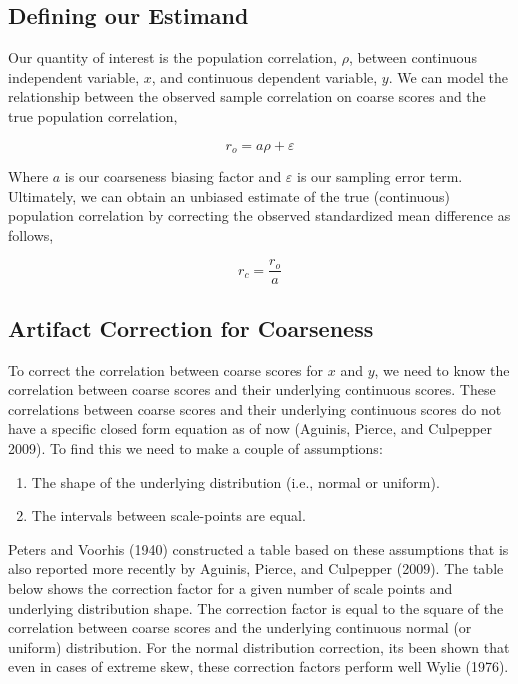 \documentclass[
  letterpaper,
  DIV=11,
  numbers=noendperiod]{scrreprt}
\providecommand{\tightlist}{%
  \setlength{\itemsep}{0pt}\setlength{\parskip}{0pt}}\usepackage{longtable,booktabs,array}
\begin{document}
\hypertarget{defining-our-estimand-5}{%
\subsection{Defining our Estimand}\label{defining-our-estimand-5}}

Our quantity of interest is the population correlation, \(\rho\),
between continuous independent variable, \(x\), and continuous dependent
variable, \(y\). We can model the relationship between the observed
sample correlation on coarse scores and the true population correlation,

\[
r_o = a\rho+\varepsilon
\]

Where \(a\) is our coarseness biasing factor and \(\varepsilon\) is our
sampling error term. Ultimately, we can obtain an unbiased estimate of
the true (continuous) population correlation by correcting the observed
standardized mean difference as follows,

\[
r_c = \frac{r_o}{a}
\]

\hypertarget{sec-coarse-cor}{%
\subsection{Artifact Correction for Coarseness}\label{sec-coarse-cor}}

To correct the correlation between coarse scores for \(x\) and \(y\), we
need to know the correlation between coarse scores and their underlying
continuous scores. These correlations between coarse scores and their
underlying continuous scores do not have a specific closed form equation
as of now (Aguinis, Pierce, and Culpepper 2009). To find this we need to
make a couple of assumptions:

\begin{enumerate}
\def\labelenumi{\arabic{enumi})}
\tightlist
\item
  The shape of the underlying distribution (i.e., normal or uniform).
\item
  The intervals between scale-points are equal.
\end{enumerate}

Peters and Voorhis (1940) constructed a table based on these assumptions
that is also reported more recently by Aguinis, Pierce, and Culpepper
(2009). The table below shows the correction factor for a given number
of scale points and underlying distribution shape. The correction factor
is equal to the square of the correlation between coarse scores and the
underlying continuous normal (or uniform) distribution. For the normal
distribution correction, its been shown that even in cases of extreme
skew, these correction factors perform well Wylie (1976).
\end{document}
